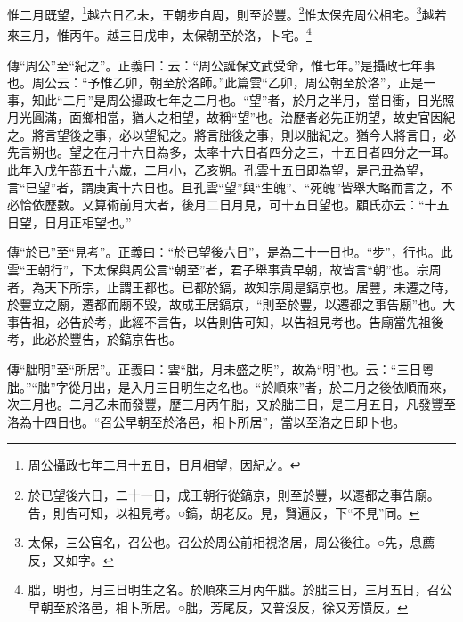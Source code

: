 惟二月既望，\footnote{周公攝政七年二月十五日，日月相望，因紀之。}越六日乙未，王朝步自周，則至於豐。\footnote{於已望後六日，二十一日，成王朝行從鎬京，則至於豐，以遷都之事告廟。告，則告可知，以祖見考。○鎬，胡老反。見，賢遍反，下“不見”同。}惟太保先周公相宅。\footnote{太保，三公官名，召公也。召公於周公前相視洛居，周公後往。○先，息薦反，又如字。}越若來三月，惟丙午。越三日戊申，太保朝至於洛，卜宅。\footnote{朏，明也，月三日明生之名。於順來三月丙午朏。於朏三日，三月五日，召公早朝至於洛邑，相卜所居。○朏，芳尾反，又普沒反，徐又芳憒反。}


{\noindent\zhuan{}\fzbyks 傳“周公”至“紀之”。正義曰：云：“周公誕保文武受命，惟七年。”是攝政七年事也。周公云：“予惟乙卯，朝至於洛師。”此篇雲“乙卯，周公朝至於洛”，正是一事，知此“二月”是周公攝政七年之二月也。“望”者，於月之半月，當日衝，日光照月光圓滿，面鄉相當，猶人之相望，故稱“望”也。治歷者必先正朔望，故史官因紀之。將言望後之事，必以望紀之。將言朏後之事，則以朏紀之。猶今人將言日，必先言朔也。望之在月十六日為多，太率十六日者四分之三，十五日者四分之一耳。此年入戊午蔀五十六歲，二月小，乙亥朔。孔雲十五日即為望，是己丑為望，言“已望”者，謂庚寅十六日也。且孔雲“望”與“生魄”、“死魄”皆舉大略而言之，不必恰依歷數。又算術前月大者，後月二日月見，可十五日望也。顧氏亦云：“十五日望，日月正相望也。” \par}

{\noindent\zhuan{}\fzbyks 傳“於已”至“見考”。正義曰：“於已望後六日”，是為二十一日也。“步”，行也。此雲“王朝行”，下太保與周公言“朝至”者，君子舉事貴早朝，故皆言“朝”也。宗周者，為天下所宗，止謂王都也。已都於鎬，故知宗周是鎬京也。居豐，未遷之時，於豐立之廟，遷都而廟不毀，故成王居鎬京，“則至於豐，以遷都之事告廟”也。大事告祖，必告於考，此經不言告，以告則告可知，以告祖見考也。告廟當先祖後考，此必於豐告，於鎬京告也。 \par}

{\noindent\zhuan{}\fzbyks 傳“朏明”至“所居”。正義曰：雲“朏，月未盛之明”，故為“明”也。云：“三日粵朏。”“朏”字從月出，是入月三日明生之名也。“於順來”者，於二月之後依順而來，次三月也。二月乙未而發豐，歷三月丙午朏，又於朏三日，是三月五日，凡發豐至洛為十四日也。“召公早朝至於洛邑，相卜所居”，當以至洛之日即卜也。 \par}

